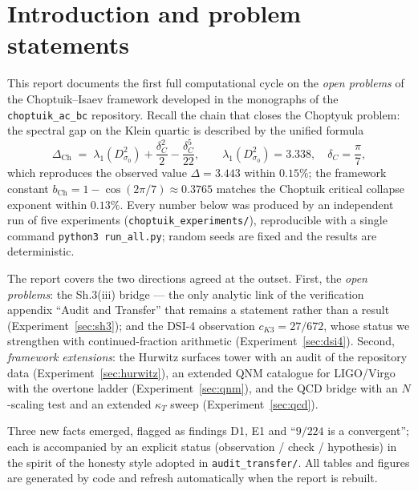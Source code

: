 \documentclass[11pt,a4paper]{article}
\begin{document}
\tableofcontents
\newpage

\section{Introduction and problem statements}\label{sec:intro}

This report documents the first full computational cycle on the \emph{open
problems} of the Choptuik--Isaev framework developed in the monographs of the
\texttt{choptuik\_ac\_bc} repository. Recall the chain that closes the
Choptyuk problem: the spectral gap on the Klein quartic is described by the
unified formula
\begin{equation}\label{eq:ch}
\Delta_{\mathrm{Ch}} \;=\; \lambda_1(D^2_{\sigma_0}) + \frac{\delta_C^2}{2} - \frac{\delta_C^5}{22},
\qquad \lambda_1(D^2_{\sigma_0}) = 3.338,\quad \delta_C = \frac{\pi}{7},
\end{equation}
which reproduces the observed value $\Delta = 3.443$ within $0.15\%$; the
framework constant $b_{\mathrm{Ch}} = 1-\cos(2\pi/7) \approx 0.3765$ matches
the Choptuik critical collapse exponent within $0.13\%$. Every number below was
produced by an independent run of five experiments
(\texttt{choptuik\_experiments/}), reproducible with a single command
\texttt{python3 run\_all.py}; random seeds are fixed and the results are
deterministic.

The report covers the two directions agreed at the outset. First, the \emph{open
problems}: the Sh.3(iii) bridge --- the only analytic link of the verification
appendix ``Audit and Transfer'' that remains a statement rather than a result
(Experiment~\ref{sec:sh3}); and the DSI-4 observation $c_{K3} = 27/672$, whose
status we strengthen with continued-fraction arithmetic
(Experiment~\ref{sec:dsi4}). Second, \emph{framework extensions}: the Hurwitz
surfaces tower with an audit of the repository data
(Experiment~\ref{sec:hurwitz}), an extended QNM catalogue for LIGO/Virgo with
the overtone ladder (Experiment~\ref{sec:qnm}), and the QCD bridge with an
$N$-scaling test and an extended $\kappa_T$ sweep
(Experiment~\ref{sec:qcd}).

Three new facts emerged, flagged as findings D1, E1 and ``$9/224$ is a
convergent''; each is accompanied by an explicit status (observation / check /
hypothesis) in the spirit of the honesty style adopted in
\texttt{audit\_transfer/}. All tables and figures are generated by code and
refresh automatically when the report is rebuilt.
\end{document}
